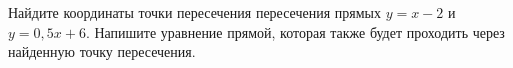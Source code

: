 \begin{ex}
	\begin{condition}
		Найдите координаты точки пересечения пересечения прямых $y=x-2$ и $y=0,5x+6$. Напишите уравнение прямой, которая также будет проходить через найденную точку пересечения.
	\end{condition}
\end{ex}
